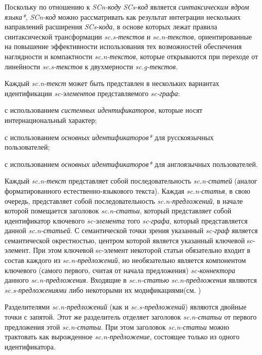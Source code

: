 Поскольку по отношению к \textit{SCn-коду} \textit{SCs-код} является \textit{синтаксическим ядром языка*}, \textit{SCn-код} можно рассматривать как результат интеграции нескольких направлений расширения \textit{SCs-кода}, в основе которых лежат правила синтаксической трансформации \textit{sc.s-текстов} и \textit{sc.n-текстов}, ориентированные на повышение эффективности использования тех возможностей обеспечения наглядности и компактности \textit{sc.n-текстов}, которые открываются при переходе от линейности \textit{sc.s-текстов} к двухмерности \textit{sc.g-текстов}.

Каждый \textit{sc.n-текст} может быть представлен в нескольких вариантах идентификации \textit{sc-элементов} представляемого \textit{sc-графа}:
\begin{textitemize}
	\item с использованием \textit{системных идентификаторов}, которые носят интернациональный характер;
	\item с использованием \textit{основных идентификаторов*} для русскоязычных пользователей;
	\item с использованием \textit{основных идентификаторов*} для англоязычных пользователей.
\end{textitemize}

Каждый \textit{sc.n-текст} представляет собой последовательность \textit{sc.n-статей} (аналог форматированного естественно-языкового текста). Каждая \textit{sc.n-статья}, в свою очередь, представляет собой последовательность \textit{sc.n-предложений}, в начале которой помещается заголовок \textit{sc.n-статьи}, который представляет собой идентификатор ключевого \textit{sc-элемента} того \textit{sc-графа}, который представляется данной \textit{sc.n-статьей}. С семантической точки зрения указанный \textit{sc-граф} является семантической окрестностью, центром которой является указанный ключевой sc-элемент. При этом ключевой sc-элемент некоторой статьи обязательно входит в состав каждого из \textit{sc.n-предложений}, но необязательно является компонентом ключевого (самого первого, считая от начала предложения) \textit{sc-коннектора} данного \textit{sc.n-предложения}. Входящие в \textit{sc.n-статью} \textit{sc.n-предложения} являются \textit{sc.s-предложениями} либо некоторыми их модификациями(см. )

Разделителями \textit{sc.n-предложений} (как и \textit{sc.s-предложений}) являются двойные точки с запятой. Этот же разделитель отделяет заголовок \textit{sc.n-статьи} от первого предложения этой \textit{sc.n-статьи}. При этом заголовок \textit{sc.n-статьи} можно трактовать как вырожденное \textit{sc.n-предложение}, состоящее только из одного идентификатора.

